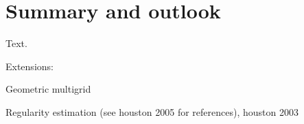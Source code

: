 \chapter{Summary and outlook}
\label{ch:summary}
Text.

Extensions:

Geometric multigrid

Regularity estimation (see houston 2005 for references), houston 2003
